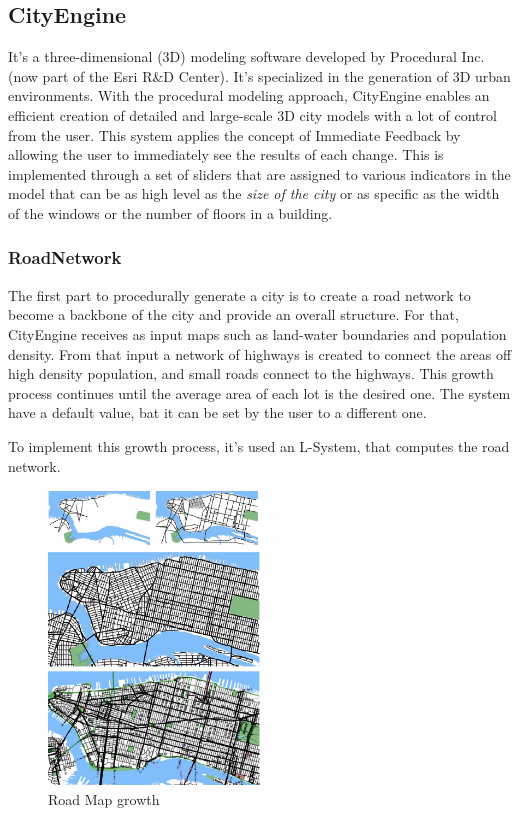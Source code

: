 
\subsection{CityEngine \cite{Parish2001} \cite{Muller2006}}
\label{sub:cityengine}

It's a three-dimensional (3D) modeling software developed by Procedural Inc. (now part of the Esri R\&D Center). It's specialized in the generation of 3D urban environments. With the procedural modeling approach, CityEngine enables an efficient creation of detailed and large-scale 3D city models with a lot of control from the user. This system applies the concept of Immediate Feedback by allowing the user to immediately see the results of each change. This is implemented through a set of sliders that are assigned to various indicators in the model that can be as high level as the \emph{size of the city} or as specific as the width of the windows or the number of floors in a building.

\subsubsection{RoadNetwork} %
\label{ssub:roadnetwork1}


The first part to procedurally generate a city is to create a road network to become a backbone of the city and provide an overall structure. For that, CityEngine receives as input maps such as land-water boundaries and population
density. From that input a network of highways is created to connect the areas off high density population, and small roads connect to the highways.
This growth process continues until the average area of each lot is the desired one. The system have a default value, bat it can be set by the user to a different one.

To implement this growth process, it's used an L-System, that computes the road network.


\begin{figure}[htbp]
  \centering
  \includegraphics[width=0.5\textwidth]{img/Procedural-Modeling-of-Cities/Capturar.png}
  \caption{Road Map growth}
  \label{fig:city}
\end{figure}

